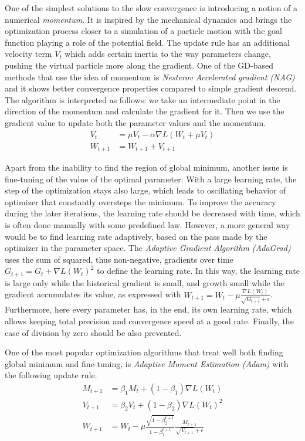 One of the simplest solutions to the slow convergence is introducing a notion of a numerical \emph{momentum}.
It is inspired by the mechanical dynamics and brings the optimization process closer to a simulation of a particle motion with the goal function playing a role of the potential field.
The update rule has an additional velocity term $V_t$ which adds certain inertia to the way parameters change, pushing the virtual particle more along the gradient. 
One of the GD-based methods that use the idea of momentum is \emph{Nesterov Accelerated gradient (NAG)} and it shows better convergence properties compared to simple gradient descend.
The algorithm is interpreted as follows: 
we take an intermediate point in the direction of the momentum and calculate the gradient for it.
Then we use the gradient value to update both the parameter values and the momentum.
\begin{align*}
	V_{t} & =\mu V_{t} - \alpha \nabla L (W_{t}+\mu V_{t}) \\
	W_{t+1} & = W_{t+1} + V_{t+1}
\end{align*}

Apart from the inability to find the region of global minimum, another issue is fine-tuning of the value of the optimal parameter.
With a large learning rate, the step of the optimization stays also large, which leads to oscillating behavior of optimizer that constantly oversteps the minimum.
To improve the accuracy during the later iterations, the learning rate should be decreased with time, which is often done manually with some predefined law. 
However, a more general way would be to find learning rate adaptively, based on the pass made by the optimizer in the parameter space.
The \textit{Adaptive Gradient Algorithm (AdaGrad)} uses the sum of squared, thus non-negative, gradients over time $G_{t+1} = G_{t}+\nabla L(W_{t})^2$ to define the learning rate.
In this way, the learning rate is large only while the historical gradient is small, and growth small while the gradient accumulates its value, as expressed with $ W_{t+1} = W_{t} -\mu \frac{\nabla L(W_{t})}{\sqrt{G_{t+1}}+\epsilon} $.
Furthermore, here every parameter has, in the end, its own learning rate, which allows keeping total precision and convergence speed at a good rate.
Finally, the case of division by zero should be also prevented. 
\medskip

One of the most popular optimization algorithms that treat well both finding global minimum and fine-tuning, is \emph{Adaptive Moment Estimation (Adam)} with the following update rule.
\begin{align*}
	M_{t+1} & = \beta_{1}M_{t} + (1-\beta_{1})\nabla L(W_{t}) \\
	V_{t+1} & = \beta_{2} V_{t} + (1-\beta_{2})\nabla L(W_{t})^2 \\
	W_{t+1} & = W_{t} - \mu \frac{\sqrt{1-\beta_{2}^{t+1}}}{1-\beta_{1}^{t+1}} \frac{M_{t+1}}{\sqrt{V_{t+1}}+\epsilon}
\end{align*}		

